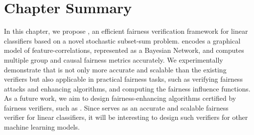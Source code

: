 \section{Chapter Summary}
In this chapter, we propose {\fvgm}, an efficient fairness verification framework for linear classifiers based on a novel stochastic subset-sum problem. {\fvgm} encodes a graphical model of feature-correlations, represented as a Bayesian Network, and computes multiple group and causal fairness metrics accurately. We experimentally demonstrate that {\fvgm} is not only more accurate and scalable than the existing verifiers but also applicable in practical fairness tasks, such as verifying fairness attacks and enhancing algorithms, and computing the fairness influence functions. 
As a future work, we aim to design fairness-enhancing algorithms certified by fairness verifiers, such as {\fvgm}. %
Since {\fvgm} serves as an accurate and scalable fairness verifier for linear classifiers, it will be interesting to design such verifiers for other machine learning models.


